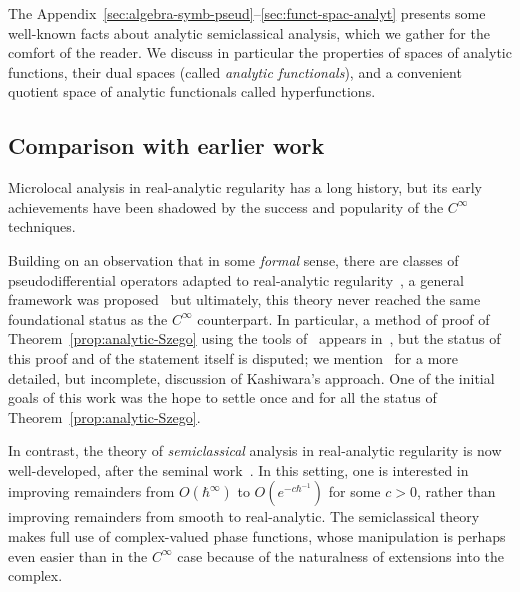 \documentclass[10pt]{amsart}
\theoremstyle{definition}\newtheorem{defi}[theo]{Definition}\newtheorem{rema}[theo]{Remark}\newtheorem{exam}[theo]{Example}\newtheorem{exem}[theo]{Example}\newtheorem{nota}[theo]{Notation}
\newcommand\1{\mathds{1}}
\begin{document}
The Appendix~\ref{sec:algebra-symb-pseud}--\ref{sec:funct-spac-analyt} presents some well-known facts about analytic semiclassical analysis, which we gather for the comfort of the reader. We discuss in particular the properties of spaces of analytic functions, their dual spaces (called \emph{analytic functi\-onals}), and a convenient quotient space of analytic functionals called hyperfunctions.

\subsection{Comparison with earlier work}\label{sec:comp-with-earl}

Microlocal analysis in real-analytic regularity has a long history, but its early achievements have been shadowed by the success and popularity of the $C^{\infty}$ techniques.

Building on an observation that in some
\emph{formal} sense, there are classes of pseudodifferential operators adapted to real-analytic regularity~\cite{boutet_de_monvel_pseudo-differential_1967}, a general framework was proposed~\cite{sato_microfunctions_1972} but ultimately, this theory never reached the same foundational status as the $C^{\infty}$ counterpart. In particular, a method of proof of Theorem~\ref{prop:analytic-Szego} using the tools of~\cite{sato_microfunctions_1972} appears in~\cite{kashiwara_analyse_1976}, but the status of this proof and of the statement itself is disputed; we mention~\cite{kaneko_introduction_1989} for a more detailed, but incomplete, discussion of Kashiwara's approach. One of the initial goals of this work was the hope to settle once and for all the status of Theorem~\ref{prop:analytic-Szego}.

In contrast, the theory of \emph{semiclassical} analysis in real-analytic regularity is now well-developed, after the seminal work~\cite{sjostrand_singularites_1982}. In this setting, one is interested in improving remainders from $O(\hbar^{\infty})$ to $O(e^{-c\hbar^{-1}})$ for some $c>0$, rather than improving remainders from smooth to real-analytic. The semiclassical theory makes full use of complex-valued phase functions, whose manipulation is perhaps even easier than in the $C^{\infty}$ case because of the naturalness of extensions into the complex.
\end{document}
